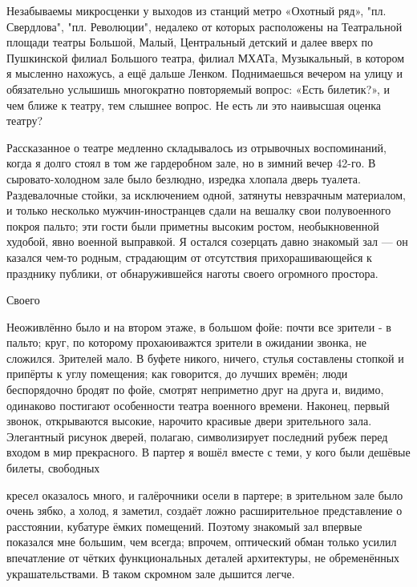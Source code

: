 \label{228-1}
Незабываемы микросценки у выходов из станций метро «Охотный ряд», "пл. Свердлова", "пл. Революции", недалеко от которых расположены на Театральной площади театры Большой, Малый, Центральный детский и далее вверх по Пушкинской филиал Большого театра, филиал МХАТа, Музыкальный, в котором я мысленно нахожусь, а ещё дальше Ленком. Поднимаешься вечером на улицу и обязательно услышишь многократно повторяемый вопрос: «Есть билетик?», и чем ближе к театру, тем слышнее вопрос. Не есть ли это наивысшая оценка театру?

\label{229-1}
Рассказанное о театре медленно складывалось из отрывочных воспоминаний, когда я долго стоял в том же гардеробном зале, но в зимний вечер 42-го. В сыровато-холодном зале было безлюдно, изредка хлопала дверь туалета. Раздевалочные стойки, за исключением одной, затянуты невзрачным материалом, и только несколько мужчин-иностранцев сдали на вешалку свои полувоенного покроя пальто; эти гости были приметны высоким ростом, необыкновенной худобой, явно военной выправкой. Я остался созерцать давно знакомый зал — он казался чем-то родным, страдающим от отсутствия прихорашивающейся к празднику публики, от обнаружившейся наготы своего огромного простора.

Своего

\label{230-1}
Неоживлённо было и на втором этаже, в большом фойе: почти все зрители - в пальто; круг, по которому прохаюиважтся зрители в ожидании звонка, не сложился. Зрителей мало. В буфете никого, ничего, стулья составлены стопкой и припёрты к углу помещения; как говорится, до лучших времён; люди беспорядочно бродят по фойе, смотрят неприметно друг на друга и, видимо, одинаково постигают особенности театра военного времени. Наконец, первый звонок, открываются высокие, нарочито красивые двери зрительного зала. Элегантный рисунок дверей, полагаю, символизирует последний рубеж перед входом в мир прекрасного. В партер я вошёл вместе с теми, у кого были дешёвые билеты, свободных

\label{231-1}
кресел оказалось много, и галёрочники осели в партере; в зрительном зале было очень зябко, а холод, я заметил, создаёт ложно расширительное представление о расстоянии, кубатуре ёмких помещений. Поэтому знакомый зал впервые показался мне большим, чем всегда; впрочем, оптический обман только усилил впечатление от чётких функциональных деталей архитектуры, не обременённых украшательствами. В таком скромном зале дышится легче.


